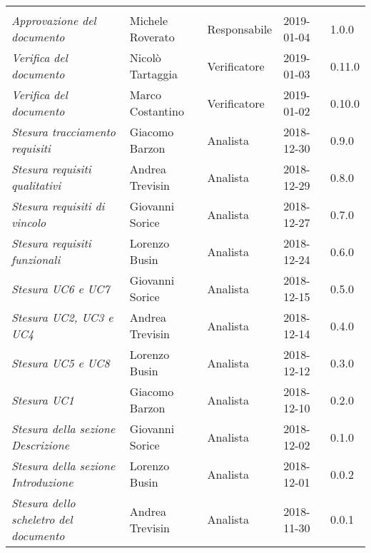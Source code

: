 \newpage 
\section*{}
\begin{table}[H]
	\centering
	\begin{tabular}{p{4cm}|C{3cm}|C{3cm}|R{2.5cm}|R{2cm}}
		
		 & & & & \\
		
		
		\emph{Approvazione del documento} & Michele Roverato & Responsabile & 2019-01-04 & 1.0.0 \\
		\hline
		
		\emph{Verifica del documento} & Nicolò Tartaggia & Verificatore & 2019-01-03 & 0.11.0 \\
		\hline
		
		\emph{Verifica del documento} & Marco Costantino & Verificatore & 2019-01-02 & 0.10.0 \\
		\hline
		
		\emph{Stesura tracciamento requisiti} & Giacomo Barzon & Analista & 2018-12-30 & 0.9.0 \\
		\hline
		
		\emph{Stesura requisiti qualitativi} & Andrea Trevisin & Analista & 2018-12-29 & 0.8.0 \\
		\hline
		
		\emph{Stesura requisiti di vincolo} & Giovanni Sorice & Analista & 2018-12-27 & 0.7.0 \\
		\hline
		
		\emph{Stesura requisiti funzionali} & Lorenzo Busin & Analista & 2018-12-24 & 0.6.0 \\
		\hline
		
		\emph{Stesura UC6 e UC7} & Giovanni Sorice & Analista & 2018-12-15 & 0.5.0 \\
		\hline
		
		\emph{Stesura UC2, UC3 e UC4} & Andrea Trevisin & Analista & 2018-12-14 & 0.4.0 \\
		\hline
		
		\emph{Stesura UC5 e UC8} & Lorenzo Busin & Analista & 2018-12-12 & 0.3.0 \\
		\hline
		
		\emph{Stesura UC1} & Giacomo Barzon & Analista & 2018-12-10 & 0.2.0 \\
		\hline
		
		\emph{Stesura della sezione Descrizione } & Giovanni Sorice & Analista & 2018-12-02 & 0.1.0 \\
		\hline
		
		\emph{Stesura della sezione Introduzione } & Lorenzo Busin & Analista & 2018-12-01 & 0.0.2 \\
		\hline
		
		\emph{Stesura dello scheletro del documento} & Andrea Trevisin & Analista & 2018-11-30 & 0.0.1 \\
		
	\end{tabular}
	
\end{table}


\clearpage